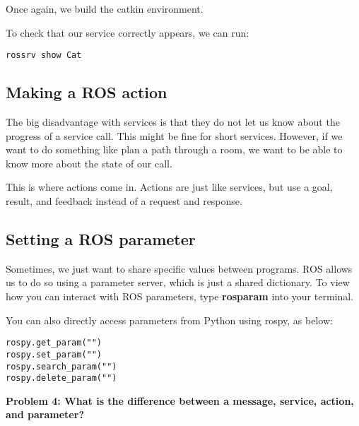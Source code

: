 Once again, we build the catkin environment.

To check that our service correctly appears, we can run:

\begin{lstlisting}
rossrv show Cat
\end{lstlisting}	

\subsection{Making a ROS action}
The big disadvantage with services is that they do not let us know about the progress of a service call. This might be fine for short services. However, if we want to do something like plan a path through a room, we want to be able to know more about the state of our call. 

This is where actions come in. Actions are just like services, but use a goal, result, and feedback instead of a request and response. 

\subsection{Setting a ROS parameter}
Sometimes, we just want to share specific values between programs. ROS allows us to do so using a parameter server, which is just a shared dictionary. To view how you can interact with ROS parameters, type \textbf{rosparam} into your terminal.

You can also directly access parameters from Python using rospy, as below:

\begin{lstlisting}
rospy.get_param("")
rospy.set_param("")
rospy.search_param("")
rospy.delete_param("")
\end{lstlisting}

 \textbf{Problem 4: What is the difference between a message, service, action, and parameter?}


